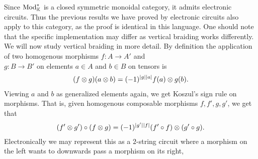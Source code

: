 \documentclass[../thesis.tex]{subfiles}
\begin{document}
            Since $\tt{Mod}_\mathbb{K}^*$ is a closed symmetric monoidal category, it admits electronic circuits. Thus the previous results we have proved by electronic circuits also apply to this category, as the proof is identical in this language. One should note that the specific implementation may differ as vertical braiding works differently. We will now study vertical braiding in more detail. By definition \cite{Kelly05} the application of two homogenous morphisms $f : A \rightarrow A'$ and \\ $g : B \rightarrow B'$ on elements $a \in A$ and $b\in B$ on tensors is
            \begin{align*}
                (f\otimes g)(a\otimes b) = (-1)^{|g||a|}f(a)\otimes g(b)\tt{.}
            \end{align*}
            Viewing $a$ and $b$ as generalized elements again, we get Koszul's sign rule on morphisms. That is, given homogenous composable morphisms $f, f', g, g'$, we get that
            \begin{align*}
                (f' \otimes g')\circ(f\otimes g) = (-1)^{|g'||f|}(f'\circ f)\otimes (g'\circ g)\tt{.}
            \end{align*}
            Electronically we may represent this as a $2$-string circuit where a morphism on the left wants to downwards pass a morphism on its right,
            \begin{center}
            \end{center}
\end{document}
